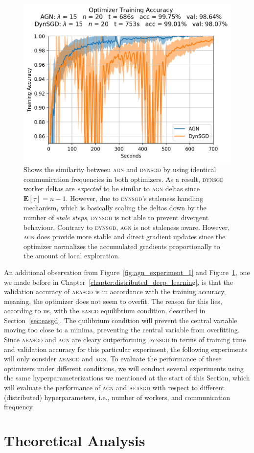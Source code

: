 \begin{figure}[H]
  \centering
  \includegraphics[width=.6\textwidth]{resources/images/agn_experiment_3}
  \caption{Shows the similarity between \textsc{agn} and \textsc{dynsgd} by using identical communication frequencies in both optimizers. As a result, \textsc{dynsgd} worker deltas are \emph{expected} to be similar to \textsc{agn} deltas since $\textbf{E}[\tau] = n - 1$. However, due to \textsc{dynsgd}'s staleness handling mechanism, which is basically scaling the deltas down by the number of \emph{stale steps}, \textsc{dynsgd} is not able to prevent divergent behaviour. Contrary to \textsc{dynsgd}, \textsc{agn} is not staleness aware. However, \textsc{agn} does provide more stable and direct gradient updates since the optimizer normalizes the accumulated gradients proportionally to the amount of local exploration.}
  \label{fig:agn_experiment_2}
\end{figure}

An additional observation from Figure~\ref{fig:agn_experiment_1} and Figure~\ref{fig:agn_experiment_2}, one we made before in Chapter~\ref{chapter:distributed_deep_learning}, is that the validation accuracy of \textsc{aeasgd} is in accordance with the training accuracy, meaning, the optimizer does not seem to overfit. The reason for this lies, according to us, with the \textsc{easgd} equilibrium condition, described in Section~\ref{sec:easgd}. The quilibrium condition will prevent the central variable moving too close to a minima, preventing the central variable from overfitting.\\

Since \textsc{aeasgd} and \textsc{agn} are cleary outperforming \textsc{dynsgd} in terms of training time and validation accuracy for this particular experiment, the following experiments will only consider \textsc{aeasgd} and \textsc{agn}. To evaluate the performance of these optimizers under different conditions, we will conduct several experiments using the same hyperparameterizations we mentioned at the start of this Section, which will evaluate the performance of \textsc{agn} and \textsc{aeasgd} with respect to different (distributed) hyperparameters, i.e., number of workers, and communication frequency.

\section{Theoretical Analysis}
\label{sec:agn_theoretical_analysis}
